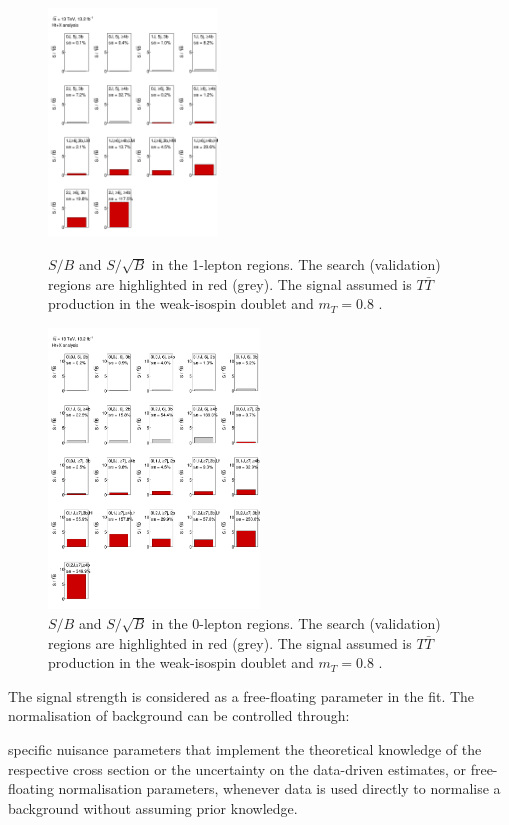 \begin{figure}[p]
\centering
\includegraphics[width=0.4\textwidth]{figures/VLQ/SignalRegions_1L.png}
\captionsetup{width=0.85\textwidth} \caption{\small $S/B$ and $S/\sqrt{B}$ in the 1-lepton regions. The search (validation) regions are highlighted in red (grey). The signal assumed is $T\bar{T}$ production in the weak-isospin doublet and $m_{T} = 0.8$ \tev.}
\label{sec:vlq:fig:SB1l}
\includegraphics[width=0.5\textwidth]{figures/VLQ/SignalRegions_0L.png}
\captionsetup{width=0.85\textwidth} \caption{\small $S/B$ and $S/\sqrt{B}$ in the 0-lepton regions. The search (validation) regions are highlighted in red (grey). The signal assumed is $T\bar{T}$ production in the weak-isospin doublet and $m_{T} = 0.8$ \tev.}
\label{sec:vlq:fig:SB0l}
\end{figure}

The signal strength is considered as a free-floating parameter in the fit. The normalisation of background can be controlled through:

\bi
\ib specific nuisance parameters that implement the theoretical knowledge of the respective cross section or the uncertainty on the data-driven estimates, or
\ib free-floating normalisation parameters, whenever data is used directly to normalise a background without assuming prior knowledge.
\ei

